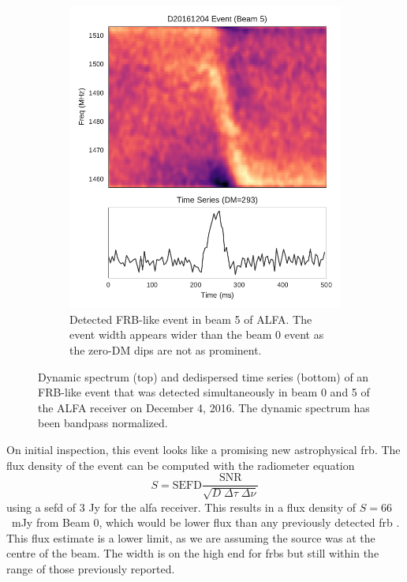 \documentclass[a4paper,fleqn,usenatbib]{mnras}
\begin{document}
\begin{figure}
\begin{subfigure}[t]{0.45\textwidth}
        \includegraphics[width=1.0\textwidth]{figures/D20161204_buf4_Beam5.pdf}
        \caption{Detected FRB-like event in beam 5 of ALFA. The event width
        appears wider than the beam 0 event as the zero-DM dips are not as
        prominent.
        }
        \label{fig:beam5_dynamic_spec}
    \end{subfigure}
    \caption{
    Dynamic spectrum (top) and dedispersed time series (bottom) of an FRB-like
    event that was detected simultaneously in beam 0 and 5 of the ALFA receiver
    on December 4, 2016. The dynamic spectrum has been bandpass normalized.
    }
    \label{fig:dynamic_spec}
\end{figure}

On initial inspection, this event looks like a promising new astrophysical
\gls{frb}. The flux density of the event can be computed with the radiometer
equation
%
$$
S = \textrm{SEFD} \frac{\textrm{SNR}}{\sqrt{D \; \Delta \tau \;
\Delta \nu}}
$$
%
using a \gls{sefd} of 3 Jy for the \gls{alfa} receiver. This results in a flux
density of $S = 66$~mJy from Beam 0, which would be lower flux than any
previously detected \gls{frb} \citep{2016PASA...33...45P}. This flux estimate is
a lower limit, as we are assuming the source was at the centre of the beam. The
width is on the high end for \glspl{frb} but still within the range of those
previously reported.
\end{document}
